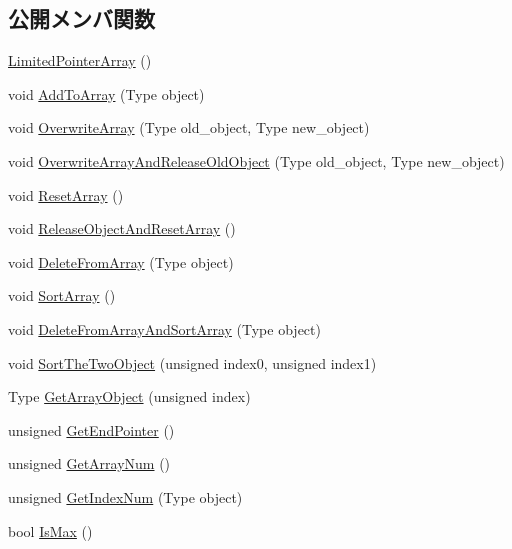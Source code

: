 \subsection*{公開メンバ関数}
\begin{DoxyCompactItemize}
\item 
\mbox{\hyperlink{class_limited_pointer_array_acab3e47d77fcd7ed7735a735e1aaf8f9}{Limited\+Pointer\+Array}} ()
\item 
void \mbox{\hyperlink{class_limited_pointer_array_a57eb08357204668710021965425f4f46}{Add\+To\+Array}} (Type object)
\item 
void \mbox{\hyperlink{class_limited_pointer_array_a7cf64a1731ab6d0d63182b6c223fae0b}{Overwrite\+Array}} (Type old\+\_\+object, Type new\+\_\+object)
\item 
void \mbox{\hyperlink{class_limited_pointer_array_a6c46bb77df04a9e1226025f8c48e26cb}{Overwrite\+Array\+And\+Release\+Old\+Object}} (Type old\+\_\+object, Type new\+\_\+object)
\item 
void \mbox{\hyperlink{class_limited_pointer_array_ae5a41fe945c1ee5ea73116b823011a8c}{Reset\+Array}} ()
\item 
void \mbox{\hyperlink{class_limited_pointer_array_a5e34faa11f4b901153f85428027aa21e}{Release\+Object\+And\+Reset\+Array}} ()
\item 
void \mbox{\hyperlink{class_limited_pointer_array_a02cfaed541d27980883ec9eb90ad3813}{Delete\+From\+Array}} (Type object)
\item 
void \mbox{\hyperlink{class_limited_pointer_array_a1093a96cb123b3fed52bdfcea1055f33}{Sort\+Array}} ()
\item 
void \mbox{\hyperlink{class_limited_pointer_array_a32dd58543bee490df6dcea079ebe4586}{Delete\+From\+Array\+And\+Sort\+Array}} (Type object)
\item 
void \mbox{\hyperlink{class_limited_pointer_array_a0d33dc5dd8ed01bb00accd6378aa1b47}{Sort\+The\+Two\+Object}} (unsigned index0, unsigned index1)
\item 
Type \mbox{\hyperlink{class_limited_pointer_array_aae48443929a3766e602eb96f515c3a34}{Get\+Array\+Object}} (unsigned index)
\item 
unsigned \mbox{\hyperlink{class_limited_pointer_array_a4c070b87cde4d2ea173aa28918af6223}{Get\+End\+Pointer}} ()
\item 
unsigned \mbox{\hyperlink{class_limited_pointer_array_a404c188412a49f58ecacabd41c974de2}{Get\+Array\+Num}} ()
\item 
unsigned \mbox{\hyperlink{class_limited_pointer_array_a2b9d42b57662f29f357b2faf1793aa66}{Get\+Index\+Num}} (Type object)
\item 
bool \mbox{\hyperlink{class_limited_pointer_array_a8bd3a7ea969f307c35934a1bf2803b40}{Is\+Max}} ()
\end{DoxyCompactItemize}
